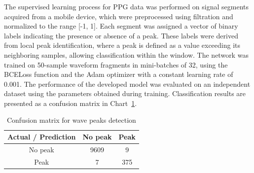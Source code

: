 \documentclass[journal]{IEEEtran}
\begin{document}
The supervised learning process for PPG data was performed on signal segments acquired from a mobile device, which were preprocessed using filtration and normalized to the range [-1, 1]. Each segment was assigned a vector of binary labels indicating the presence or absence of a peak. These labels were derived from local peak identification, where a peak is defined as a value exceeding its neighboring samples, allowing classification within the window. The network was trained on 50-sample waveform fragments in mini-batches of 32, using the BCELoss function and the Adam optimizer with a constant learning rate of 0.001. The performance of the developed model was evaluated on an independent dataset using the parameters obtained during training. Classification results are presented as a confusion matrix in Chart~\ref{tab:conf_matrix_ppg}.

\begin{table}[ht]
\centering
\caption{Confusion matrix for wave peaks detection}
\label{tab:conf_matrix_ppg}
\begin{tabular}{|c|c|c|}
\hline
\textbf{Actual / Prediction} & \textbf{No peak } & \textbf{Peak} \\
\hline
No peak  & 9609 & 9 \\

Peak  & 7 & 375 \\
\hline
\end{tabular}
\end{table}
\end{document}
